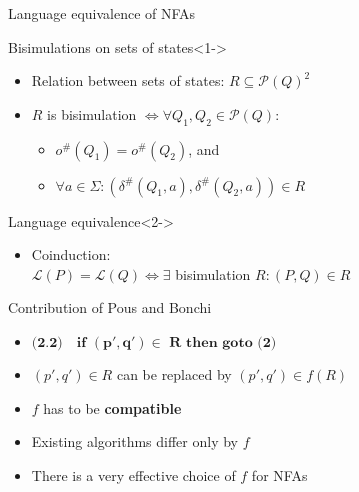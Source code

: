 \documentclass[compress]{beamer}
\begin{document}
\begin{frame}{Language equivalence of NFAs}
  \begin{block}{Bisimulations on sets of states}<1->
    \begin{itemize}
      \item Relation between sets of states: $R \subseteq \mathcal{P}(Q)^2$%
      \item $R$ is bisimulation $\iff \forall Q_1, Q_2 \in \mathcal{P}(Q): $
        \begin{itemize}
          \item $o^\#(Q_1) = o^\#(Q_2)$, and
          \item $\forall a \in \Sigma: (\delta^\#(Q_1, a), \delta^\#(Q_2, a)) \in R$
        \end{itemize}
    \end{itemize}
  \end{block}

  \begin{block}{Language equivalence}<2->
    \begin{itemize}
      \item
      Coinduction:\\
        $\mathcal{L}(P) = \mathcal{L}(Q) \iff \exists$ bisimulation $R: (P, Q) \in R$
    \end{itemize}
  \end{block}
\end{frame}

\begin{frame}{Contribution of Pous and Bonchi}
  \begin{itemize}
      \item<1-> $\textbf{(2.2)}\quad \textbf{if } \mathbf{(p', q') \in} \textbf{ R} \textbf{ then goto (2)}$
      \item<2-> $(p', q') \in R$ can be replaced by $(p', q') \in f(R)$
      \item<2-> $f$ has to be \textbf{compatible}
      \item<3-> Existing algorithms differ only by $f$
      \item<4-> There is a very effective choice of $f$ for NFAs
    \end{itemize}
\end{frame}
\end{document}
